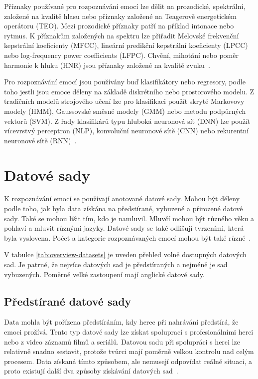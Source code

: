 \documentclass[FM,BP]{tulthesis}
\begin{document}
Příznaky používané pro rozpoznávání emocí lze dělit na prozodické, spektrální, založené na kvalitě hlasu nebo příznaky založené na Teagerově energetickém operátoru (TEO). Mezi prozodické příznaky patří na příklad intonace nebo rytmus. K příznakům založených na spektru lze přiřadit Melovské frekvenční kepstrální koeficienty (MFCC), lineární predikční kepstrální koeficienty (LPCC) nebo log-frequency power coeﬀicients (LFPC). Chvění, mihotání nebo poměr harmonie k hluku (HNR) jsou příznaky založené na kvalitě zvuku~\cite{DBLP:journals/speech/AkcayO20}.

Pro rozpoznávání emocí jsou používány buď klasifikátory nebo regresory, podle toho jestli jsou emoce děleny na základě diskrétního nebo prostorového modelu. Z tradičních modelů strojového učení lze pro klasifikaci použít skryté Markovovy modely (HMM), Gaussovské směsné modely (GMM) nebo metodu podpůrných vektorů (SVM). Z řady klasifikárů typu hluboká neuronová síť (DNN) lze použít vícevrstvý perceptron (NLP), konvoluční neuronové sítě (CNN) nebo rekurentní neuronové sítě (RNN)~\cite{DBLP:journals/speech/AkcayO20}.

\chapter{Datové sady} %
K rozpoznávání emocí se používají anotované datové sady. Mohou být děleny podle toho, jak byla data získána na předstírané, vybuzené a přirozené datové sady. Také se mohou lišit tím, kdo je namluvil. Mluvčí mohou být různého věku a pohlaví a mluvit různými jazyky. Datové sady se také odlišují tvrzeními, která byla vyslovena. Počet a kategorie rozpoznávaných emocí mohou být také různé~\cite{DBLP:journals/speech/AkcayO20}.

V tabulce \ref{tab:overview-datasets} je uveden přehled volně dostupných datových sad. Je patrné, že nejvíce datových sad je předstíraných a nejméně je sad vybuzených. Poměrně velké zastoupení mají anglické datové sady.

\section{Předstírané datové sady} %
Data mohla být pořízena předstíráním, kdy herec při nahrávání předstírá, že emoci prožívá. Tento typ datové sady lze získat spoluprací s profesionálními herci nebo z video záznamů filmů a seriálů. Datovou sadu při spolupráci s herci lze relativně snadno sestavit, protože tvůrci mají poměrně velkou kontrolu nad celým procesem. Data získaná tímto způsobem, ale nemusejí odpovídat reálné situaci, a proto existují další dva způsoby získávání datových sad~\cite{konar_chakraborty_2015}.
\end{document}
